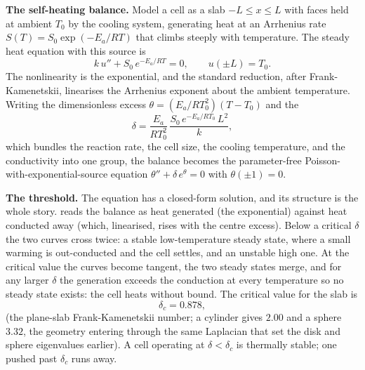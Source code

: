 \textbf{The self-heating balance.} Model a cell as a slab
$-L \leq x \leq L$ with faces held at ambient $T_{0}$ by the cooling
system, generating heat at an Arrhenius rate $S(T) = S_{0}\exp(-E_{a}
/RT)$ that climbs steeply with temperature. The steady heat equation
with this source is
\[
k\, u'' + S_{0}\, e^{-E_{a}/RT} = 0, \qquad u(\pm L) = T_{0}.
\]
The nonlinearity is the exponential, and the standard reduction,
after Frank-Kamenetskii, linearises the Arrhenius exponent about the
ambient temperature. Writing the dimensionless excess $\theta =
(E_{a}/RT_{0}^{2})(T - T_{0})$ and the 
\[
\delta = \frac{E_{a}}{RT_{0}^{2}}\,\frac{S_{0}\, e^{-E_{a}/RT_{0}}\, L^{2}}{k},
\]
which bundles the reaction rate, the cell size, the cooling
temperature, and the conductivity into one group, the balance becomes
the parameter-free Poisson-with-exponential-source equation $\theta''
+ \delta\, e^{\theta} = 0$ with $\theta(\pm 1) = 0$.

\textbf{The threshold.} The equation has a closed-form solution, and
its structure is the whole story.  reads
the balance as heat generated (the exponential) against heat conducted
away (which, linearised, rises with the centre excess). Below a
critical $\delta$ the two curves cross twice: a stable low-temperature
steady state, where a small warming is out-conducted and the cell
settles, and an unstable high one. At the critical value the curves
become tangent, the two steady states merge, and for any larger
$\delta$ the generation exceeds the conduction at every temperature so
no steady state exists: the cell heats without bound. The critical
value for the slab is
\[
\delta_{c} = 0.878,
\]
(the plane-slab Frank-Kamenetskii number; a cylinder gives $2.00$ and
a sphere $3.32$, the geometry entering through the same Laplacian that
set the disk and sphere eigenvalues earlier). A cell operating at
$\delta < \delta_{c}$ is thermally stable; one pushed past
$\delta_{c}$ runs away.

